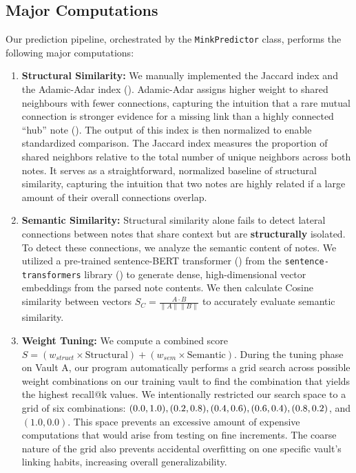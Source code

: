 \documentclass[fontsize=11pt]{article}
\begin{document}
\subsection*{Major Computations}
Our prediction pipeline, orchestrated by the \texttt{MinkPredictor} class, performs the following major computations:
\begin{enumerate}
    \item \textbf{Structural Similarity:} We manually implemented the Jaccard index and the Adamic-Adar index (\cite{adamic2003}). Adamic-Adar assigns higher weight to shared neighbours with fewer connections, capturing the intuition that a rare mutual connection is stronger evidence for a missing link than a highly connected \enquote{hub} note (\cite{graphty_adamic}). The output of this index is then normalized to enable standardized comparison. The Jaccard index measures the proportion of shared neighbors relative to the total number of unique neighbors across both notes. It serves as a straightforward, normalized baseline of structural similarity, capturing the intuition that two notes are highly related if a large amount of their overall connections overlap.
    \item \textbf{Semantic Similarity:} Structural similarity alone fails to detect lateral connections between notes that share context but are \textbf{structurally} isolated. To detect these connections, we analyze the semantic content of notes. We utilized a pre-trained sentence-BERT transformer (\cite{reimers2019}) from the \texttt{sentence-transformers} library (\cite{sbert_lib}) to generate dense, high-dimensional vector embeddings from the parsed note contents. We then calculate Cosine similarity between vectors $S_C = \frac{A \cdot B}{\|A\| \|B\|}$ to accurately evaluate semantic similarity.
    \item \textbf{Weight Tuning:} We compute a combined score $S = (w_{struct} \times \text{Structural}) + (w_{sem} \times \text{Semantic})$. During the tuning phase on Vault A, our program automatically performs a grid search across possible weight combinations on our training vault to find the combination that yields the highest recall@k values. We intentionally restricted our search space to a grid of six combinations: $(0.0, 1.0), (0.2, 0.8), (0.4, 0.6), (0.6, 0.4),\\ (0.8, 0.2)$, and $(1.0, 0.0)$. This space prevents an excessive amount of expensive computations that would arise from testing on fine increments. The coarse nature of the grid also prevents accidental overfitting on one specific vault's linking habits, increasing overall generalizability.

\end{enumerate}
\end{document}
